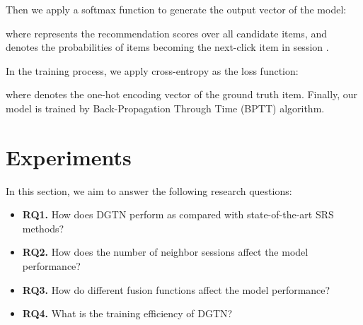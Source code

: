 \documentclass[conference]{IEEEtran}
\begin{document}
Then we apply a softmax function to generate the output vector  of the model:

where  represents the recommendation scores over all candidate items, and  denotes the probabilities of items becoming the next-click item in session .

In the training process, we apply cross-entropy as the loss function:

where  denotes the one-hot encoding vector of the ground truth item.
Finally, our model is trained by Back-Propagation Through Time (BPTT) algorithm.

\section{Experiments}
\label{e}
In this section, we aim to answer the following research questions:
\begin{itemize}
    \item {\textbf{RQ1.} How does DGTN perform as compared with state-of-the-art SRS methods?}
    \item {\textbf{RQ2.} How does the number of neighbor sessions affect the model performance?}
    \item {\textbf{RQ3.} How do different fusion functions affect the model performance?}
    \item {\textbf{RQ4.} What is the training efficiency of DGTN?}
\end{itemize}


\begin{table*}
\centering
\scriptsize
\caption{Statistics of datasets used in our experiments.}\label{tab1}
\end{table*}
\end{document}
